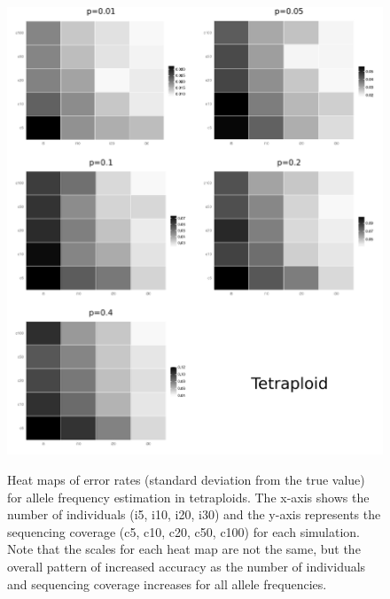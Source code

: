 \documentclass[11pt,english,letterpaper,oneside]{article}
\begin{document}
\begin{figure}
\centering
\caption{Heat maps of error rates (standard deviation from the true value) for allele frequency estimation in tetraploids. The x-axis shows the number of individuals (i5, i10, i20, i30) and the y-axis represents the sequencing coverage (c5, c10, c20, c50, c100) for each simulation. Note that the scales for each heat map are not the same, but the overall pattern of increased accuracy as the number of individuals and sequencing coverage increases for all allele frequencies.}
\vspace{0.25in}
\includegraphics{fig/figure2-tetra-heatmaps}
\label{fig:tetra-heatmaps}
\end{figure}
\end{document}
